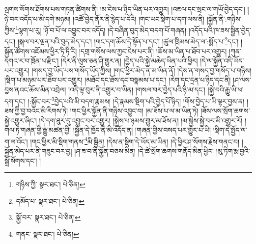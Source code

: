ལྤགས་སོགས་ཐོགས་པས་གཏན་ཚིགས་ནི། །མ་ངེས་པ་ཉིད་ཡིན་པར་འགྱུར། །འཇལ་དང་སྲང་ལ་གཡོ་བྱེད་དང་། །ཉེ་བར་འདོད་པ་མི་དགེ་མཉམ། །འཚོ་བྱེད་ནོར་ནི་རྙེད་པ་དེའི། །གང་ཡང་སྡིག་པ་དག་ལས་ནི། །སྐྱོན་ནི་:གཉིས་ཀྱིས་\footnote{གཉིས་ཀྱི་  སྣར་ཐང་།  པེ་ཅིན། }ལྷག་པ་རུ། །ཉོ་བ་པོ་ལ་འབྱུང་བར་འདོད། །དེ་བཞིན་བུད་མེད་བདག་པོ་གཞན། །འདོད་པའི་ཁ་ཟས་སྦྱིན་བྱེད་དང་། །སྐལ་བར་ལྡན་པའི་བུད་མེད་དང་། །གང་དག་ཆོས་དེ་སྟོན་པ་དང་། །ཚུལ་ཁྲིམས་མེད་ལ་:སྨོད་པ་\footnote{དམོད་པ་  སྣར་ཐང་།  པེ་ཅིན། }དང་། །སྐྱོན་ཚོགས་འཇོམས་ཕྱིར་ཏི་ཏི་རི། །དགྲ་གསོས་ལས་ཀྱང་ངེས་པར་ནི། །ཆོས་མ་ཡིན་པ་ཐོབ་པར་འགྱུར། །ཀུན་དགའ་ར་བ་ཁྲོན་པ་རྫིང་། །དེར་ནི་ལུས་ཅན་ཤི་གྱུར་ན། །བྱེད་པའི་སྐྱེ་མཆེད་ཡིན་པའི་ཕྱིར། །དེ་ལ་སྐྱོན་འདི་ཡོད་པར་འགྱུར། །གསད་བྱ་ཡོད་པས་གསོད་ཡོད་ཀྱིས། །གང་ཕྱིར་མེད་ན་མ་ཡིན་ནོ། །དེས་ན་གསད་བྱ་གསོད་པ་གཉིས། །སྡིག་པ་མཉམ་པར་ཐོབ་པར་འགྱུར། །མཐོང་དང་ཐོས་དང་བསྣམས་པ་དང་། །རེག་དང་དྲན་པ་ཉིད་དང་ནི། །ཤ་ལས་བྱས་ནའང་ཆོས་མིན་འབྲེལ། །འདི་ལྟ་བུར་ནི་འགྱུར་བ་ཡིན། །གསལ་བར་བྱེད་པའི་ཉི་མ་དང་། །སྐྱེ་བའི་རྒྱུ་ཡི་ཕ་དག་དང་། །:སྐྱོང་བར་\footnote{སྐྱོ་བར་  སྣར་ཐང་།  པེ་ཅིན། }བྱེད་པའི་མི་བདག་རྣམས། །དེ་རྣམས་སྡིག་པའི་བྱེད་པོ་ཉིད། །གོས་བྱེད་པ་ཡི་ལྟར་བྱས་ན། །ཟས་ཀྱི་བྱ་བའང་མི་རིགས་ཏེ། །གང་ཕྱིར་སྐྱོན་ནི་གཉིས་འབྱུང་བ། །མ་ཟོས་པ་ལ་མ་ཡིན་ཏེ། །ཟོས་ལས་སྲོག་ཆགས་སྐྱེ་འགྱུར་ཞིང་། །དེ་དག་ཐུར་དུ་འབྱུང་བར་འགྱུར། །སྐྱེས་པ་ཉམས་གྱུར་མ་ཟོས་ན། །མ་སྐྱེས་སྐྱེ་བར་མི་འགྱུར་རོ། །གལ་ཏེ་གཞན་གྱི་རྒྱུ་མཚན་གྱི། །སྐྱོན་དེ་ཁྱོད་ནི་མི་འདོད་ན། །གཞན་གྱིས་བསད་པར་གྱུར་པ་ཡི། །སྡིག་དེ་སྤྱོད་ལ་ག་ལ་འོང་། །གང་ཕྱིར་མི་སྡིག་གནས་\footnote{གནང་  སྣར་ཐང་།  པེ་ཅིན། }མི་སྦྱིན། །དེས་ན་སྡིག་དེ་ཡོད་མ་ཡིན། །དེ་ཕྱིར་ཤ་སོགས་རྗེས་གནང་བ། །སྐྱོན་མེད་པར་ནི་གཟུང་བར་བྱ། །ཤ་ཟ་བ་ནི་སྐྱོན་བཅས་མིན། །དེ་ཚེ་སྲོག་ཆགས་གནོད་མིན་ཕྱིར། །མུ་ཏིག་རྨ་བྱའི་སྒྲོ་སོགས་དང་། །
